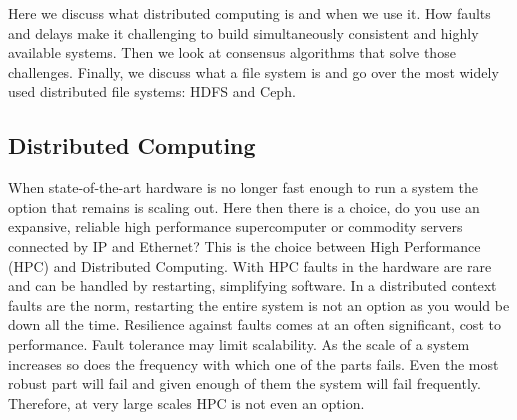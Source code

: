 Here we discuss what distributed computing is and when we use it. How faults and delays make it challenging to build simultaneously consistent and highly available systems. Then we look at consensus algorithms that solve those challenges. Finally, we discuss what a file system is and go over the most widely used distributed file systems: HDFS and Ceph.

\subsection{Distributed Computing}
When state-of-the-art hardware is no longer fast enough to run a system the option that remains is scaling out. Here then there is a choice, do you use an expansive, reliable high performance supercomputer or commodity servers connected by IP and Ethernet? This is the choice between High Performance (HPC) and Distributed Computing. With HPC faults in the hardware are rare and can be handled by restarting, simplifying software. In a distributed context faults are the norm, restarting the entire system is not an option as you would be down all the time. Resilience against faults comes at an often significant, cost to performance. Fault tolerance may limit scalability. As the scale of a system increases so does the frequency with which one of the parts fails. Even the most robust part will fail and given enough of them the system will fail frequently. Therefore, at very large scales HPC is not even an option. 
